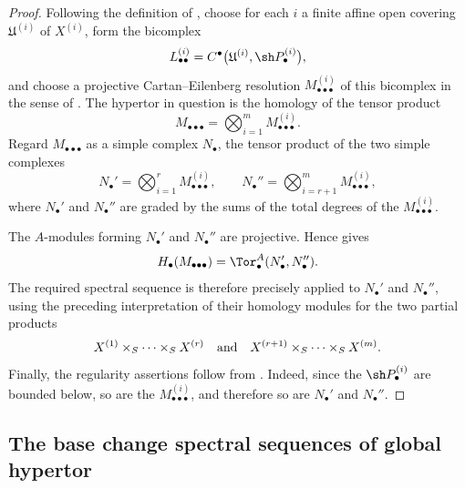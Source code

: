 \begin{proof}

Following the definition of , choose for each $i$
a finite affine open covering $\mathfrak U^{(i)}$ of $X^{(i)}$,
form the bicomplex
\[
  L_{\bullet\bullet}^{(i)}
  =
  C^\bullet
  \bigl(
    \mathfrak U^{(i)},\sh P_\bullet^{(i)}
  \bigr),
\]
and choose a projective Cartan--Eilenberg resolution
$M_{\bullet\bullet\bullet}^{(i)}$ of this bicomplex in the sense
of .  The hypertor in question is the homology
of the tensor product
\[
  M_{\bullet\bullet\bullet}
  =
  \bigotimes_{i=1}^{m}
  M_{\bullet\bullet\bullet}^{(i)}.
\]
Regard $M_{\bullet\bullet\bullet}$ as a simple complex
$N_\bullet$, the tensor product of the two simple complexes
\[
  N_\bullet'
  =
  \bigotimes_{i=1}^{r}
  M_{\bullet\bullet\bullet}^{(i)},
  \qquad
  N_\bullet''
  =
  \bigotimes_{i=r+1}^{m}
  M_{\bullet\bullet\bullet}^{(i)},
\]
where $N_\bullet'$ and $N_\bullet''$ are graded by the sums of the
total degrees of the $M_{\bullet\bullet\bullet}^{(i)}$.

The $A$-modules forming $N_\bullet'$ and $N_\bullet''$ are
projective.  Hence  gives
\[
  H_\bullet(M_{\bullet\bullet\bullet})
  =
  \Tor_\bullet^A(N_\bullet',N_\bullet'').
\]
The required spectral sequence is therefore precisely
 applied to $N_\bullet'$ and $N_\bullet''$,
using the preceding interpretation of their homology modules for
the two partial products
\[
  X^{(1)}\times_S\cdots\times_SX^{(r)}
  \quad\hbox{and}\quad
  X^{(r+1)}\times_S\cdots\times_SX^{(m)}.
\]
Finally, the regularity assertions follow from
.  Indeed, since the
$\sh P_\bullet^{(i)}$ are bounded below, so are the
$M_{\bullet\bullet\bullet}^{(i)}$, and therefore so are
$N_\bullet'$ and $N_\bullet''$.
\end{proof}

\subsection{The base change spectral sequences of global hypertor}
\label{subsection:III.6.9}
\label{III.6.9}


